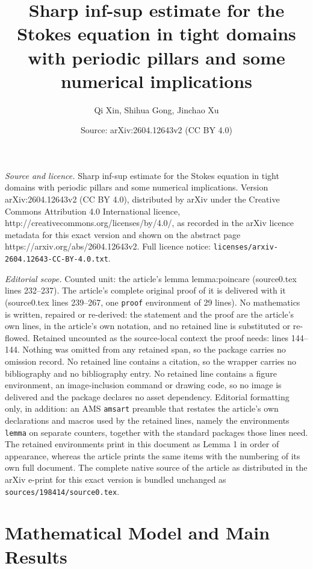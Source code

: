 \documentclass[10pt,a4paper]{amsart}
\title{Sharp inf-sup estimate for the Stokes equation in tight domains with periodic pillars and some numerical implications}
\author{Qi Xin, Shihua Gong, Jinchao Xu}
\date{Source: arXiv:2604.12643v2 (CC BY 4.0)}
\begin{document}
\maketitle

\noindent\emph{Source and licence.} Sharp inf-sup estimate for the Stokes equation in tight domains with periodic pillars and some numerical implications. Version arXiv:2604.12643v2 (CC BY 4.0), distributed by arXiv under the Creative Commons Attribution 4.0 International licence, http://creativecommons.org/licenses/by/4.0/, as recorded in the arXiv licence metadata for this exact version and shown on the abstract page https://arxiv.org/abs/2604.12643v2. Full licence notice: \texttt{licenses/arxiv-2604.12643-CC-BY-4.0.txt}.\par\smallskip

\noindent\textit{Editorial scope.} Counted unit: the article's lemma lemma:poincare (source0.tex lines 232--237). The article's complete original proof of it is delivered with it (source0.tex lines 239--267, one \texttt{proof} environment of 29 lines). No mathematics is written, repaired or re-derived: the statement and the proof are the article's own lines, in the article's own notation, and no retained line is substituted or re-flowed.  Retained uncounted as the source-local context the proof needs: lines 144--144.  Nothing was omitted from any retained span, so the package carries no omission record.  No retained line contains a citation, so the wrapper carries no bibliography and no bibliography entry.  No retained line contains a figure environment, an image-inclusion command or drawing code, so no image is delivered and the package declares no asset dependency.  Editorial formatting only, in addition: an AMS \texttt{amsart} preamble that restates the article's own declarations and macros used by the retained lines, namely the environments \texttt{lemma} on separate counters, together with the standard packages those lines need.  The retained environments print in this document as Lemma 1 in order of appearance, whereas the article prints the same items with the numbering of its own full document.  The complete native source of the article as distributed in the arXiv e-print for this exact version is bundled unchanged as \texttt{sources/198414/source0.tex}.
\section{Mathematical Model and Main Results}\label{sec:problem_main_results}
\end{document}
